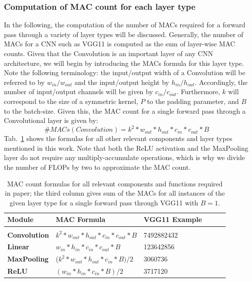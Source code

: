 \subsubsection{Computation of MAC count for each layer type}
\label{sec:appendix-macs-computation}
In the following, the computation of the number of MACs required for a forward pass through a variety of layer types will be discussed. Generally, the number of MACs for a CNN such as VGG11 is computed as the sum of layer-wise MAC counts. Given that the Convolution is an important layer of any CNN architecture, we will begin by introducing the MACs formula for this layer type. Note the following terminology: the input/output width of a Convolution will be referred to by $w_{in}/w_{out}$ and the input/output height by $h_{in}/h_{out}$. Accordingly, the number of input/output channels will be given by $c_{in}/c_{out}$. Furthermore, $k$ will correspond to the size of a symmetric kernel, $P$ to the padding parameter, and $B$ to the batch-size. Given this, the MAC count for a single forward pass through a Convolutional layer is given by:
$$\#MACs(Convolution) = k^2 * w_{out} * h_{out} * c_{in} * c_{out} * B$$
Tab.~\ref{tab:mac-count-formulas} shows the formulas for all other relevant components and layer types mentioned in this work. Note that both the ReLU activation and the MaxPooling layer do not require any multiply-accumulate operations, which is why we divide the number of FLOPs by two to approximate the MAC count.
\begin{table}[t]
    \caption{MAC count formulas for all relevant components and functions required in paper; the third column gives sum of the MACs for all instances of the given layer type for a single forward pass through VGG11 with $B=1$.}
    \label{tab:mac-count-formulas}
    \begin{center}
        \begin{tabular}{l|lllll}
        \multicolumn{1}{l}{\bf Module}  & \multicolumn{1}{l}{\bf MAC Formula} & \multicolumn{1}{l}{\bf VGG11 Example}
\\ \hline \\
\textbf{Convolution}    & $k^2 * w_{out} * h_{out} * c_{in} * c_{out} * B$      & 7492882432 \\
\textbf{Linear}& $w_{in} * h_{in} * c_{in} * c_{out} * B$              & 123642856 \\
\textbf{MaxPooling}     & ($k^2 * w_{out} * h_{out} * c_{in} * B)/2$            & 3060736 \\
\textbf{ReLU}           & $(w_{in} * h_{in} * c_{in} * B)/2$                    & 3717120 \\
\end{tabular}
    \end{center}
\end{table}
%
